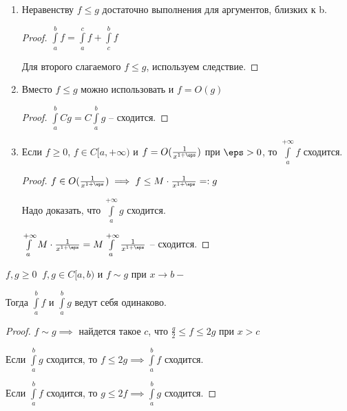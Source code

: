 \begin{remark}
    \begin{enumerate}
    
        \item Неравенству $f \le g$ достаточно выполнения для аргументов, близких к b.
        \begin{proof} \thmslashn
            $\int\limits_{a}^{b} f = \int\limits_{a}^{c} f + \int\limits_{c}^{b} f$
    
            Для второго слагаемого $f \le g$, используем следствие.
        \end{proof}
    
        \item Вместо $f \le g$ можно использовать и $f = O(g)$
        \begin{proof} \thmslashn
            $\int\limits_{a}^{b} Cg = C \int\limits_{a}^{b} g $ -- сходится.
        \end{proof}
    
        \item Если $f \ge 0$, $f \in C[a,+\infty)$ и $f = O(\frac1{x^{1+\eps}})$ при $\eps > 0$, то $\int\limits_{a}^{+\infty} f $ сходится.
        \begin{proof} \thmslashn
            $f \in O(\frac1{x^{1+\eps}}) \implies f \le M\cdot \frac1{x^{1+\eps}} =: g$
			
			Надо доказать, что $\int\limits_a^{+\infty} g$ сходится.
			
			$\int\limits_a^{+\infty}  M\cdot \frac1{x^{1+\eps}} = M\int\limits_a^{+\infty} \frac1{x^{1+\eps}}$ -- сходится.

        \end{proof}
    \end{enumerate}

\end{remark}

\begin{consequence} \thmslashn
    $f, g \ge 0 \;\; f,g \in C[a,b)$ и $f \sim g$ при $x \to b-$
		
    Тогда $\int\limits_a^b f$ и $\int\limits_a^b g$ ведут себя одинаково.

\end{consequence}

\begin{proof} \thmslashn
    $f \sim g \implies$ найдется такое $c$, что $\frac{g}{2} \le f \le 2g$ при $x > c$

    Если $\int\limits_{a}^{b} g $ сходится, то $f \le 2g \implies \int\limits_{a}^{b} f$ сходится.

    Если $\int\limits_{a}^{b} f $ сходится, то $g \le 2f \implies \int\limits_{a}^{b} g$ сходится.
\end{proof}

